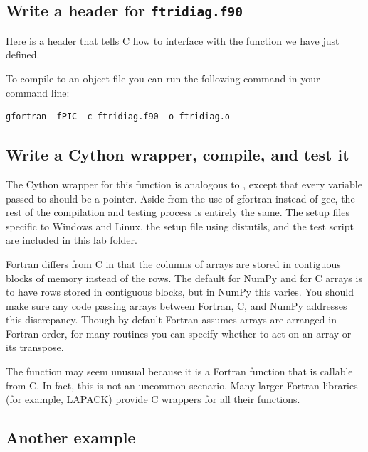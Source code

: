 \subsection*{Write a header for \texttt{ftridiag.f90}}
Here is a header that tells C how to interface with the function we have just defined.


To compile  to an object file you can run the following command in your command line:
\begin{lstlisting}[style=ShellInput]
gfortran -fPIC -c ftridiag.f90 -o ftridiag.o
\end{lstlisting}

\subsection*{Write a Cython wrapper, compile, and test it}
The Cython wrapper for this function is analogous to , except that every variable passed to  should be a pointer.
Aside from the use of gfortran instead of gcc, the rest of the compilation and testing process is entirely the same.
The setup files specific to Windows and Linux, the setup file using distutils, and the test script are included in this lab folder.

\begin{warn}
Fortran differs from C in that the columns of arrays are stored in contiguous blocks of memory instead of the rows.
The default for NumPy and for C arrays is to have rows stored in contiguous blocks, but in NumPy this varies.
You should make sure any code passing arrays between Fortran, C, and NumPy addresses this discrepancy.
Though by default Fortran assumes arrays are arranged in Fortran-order, for many routines you can specify whether to act on an array or its transpose.
\end{warn}

\begin{info}
The function  may seem unusual because it is a Fortran function that is callable from C.
In fact, this is not an uncommon scenario.
Many larger Fortran libraries (for example, LAPACK) provide C wrappers for all their functions.
\end{info}

\subsection*{Another example}

